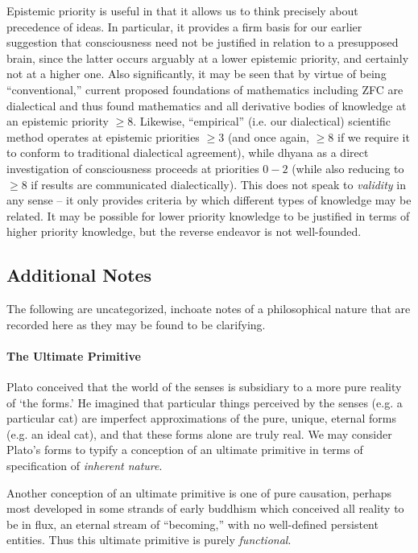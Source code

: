 \documentclass[pra,twocolumn,groupedaddress,10pt]{revtex4}
\theoremstyle{definition}
\begin{document}
Epistemic priority is useful in that it allows us to think precisely about precedence of ideas. In particular, it provides a firm basis for our earlier suggestion that consciousness need not be justified in relation to a presupposed brain, since the latter occurs arguably at a lower epistemic priority, and certainly not at a higher one. Also significantly, it may be seen that by virtue of being ``conventional,'' current proposed foundations of mathematics including ZFC are dialectical and thus found mathematics and all derivative bodies of knowledge at an epistemic priority $\geq 8$. Likewise, ``empirical'' (i.e. our dialectical) scientific method operates at epistemic priorities $\geq 3$ (and once again, $\geq 8$ if we require it to conform to traditional dialectical agreement), while dhyana as a direct investigation of consciousness proceeds at priorities $0 - 2$ (while also reducing to $\geq 8$ if results are communicated dialectically). This does not speak to \emph{validity} in any sense -- it only provides criteria by which different types of knowledge may be related. It may be possible for lower priority knowledge to be justified in terms of higher priority knowledge, but the reverse endeavor is not well-founded.

\subsection{Additional Notes}

The following are uncategorized, inchoate notes of a philosophical nature that are recorded here as they may be found to be clarifying.

\paragraph{The Ultimate Primitive} \label{sec:ultpri} Plato conceived that the world of the senses is subsidiary to a more pure reality of `the forms.' He imagined that particular things perceived by the senses (e.g. a particular cat) are imperfect approximations of the pure, unique, eternal forms (e.g. an ideal cat), and that these forms alone are truly real. We may consider Plato's forms to typify a conception of an ultimate primitive in terms of specification of \emph{inherent nature}.

Another conception of an ultimate primitive is one of pure causation, perhaps most developed in some strands of early buddhism which conceived all reality to be in flux, an eternal stream of ``becoming,'' with no well-defined persistent entities. Thus this ultimate primitive is purely \emph{functional}.
\end{document}
